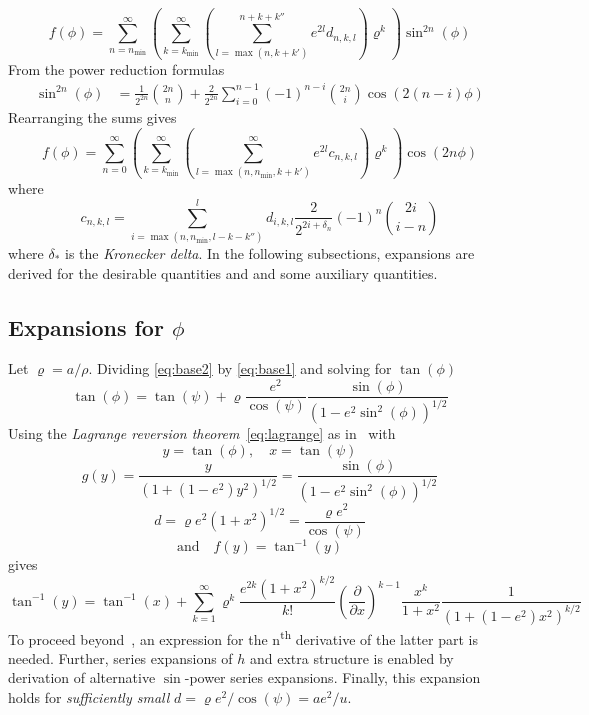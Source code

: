 \documentclass[a4paper]{amsart}
\begin{document}
\begin{equation*}
f(\phi) = \sum_{n=n_{\min}}^\infty \left(\sum_{k=k_{\min}}^\infty\left(\sum_{l=\max(n,k+k')}^{n+k+k''} e^{2l}d_{n,k,l}\right)\varrho^k\right)\sin^{2n}(\phi)
\end{equation*}
From the power reduction formulas
\begin{align*}
\sin^{2n}(\phi) &= \frac{1}{2^{2n}}\binom{2n}{n} + \frac{2}{2^{2n}}\sum_{i=0}^{n-1}(-1)^{n-i}\binom{2n}{i}\cos(2(n-i)\phi)
\end{align*}
Rearranging the sums gives
\begin{equation}
f(\phi)=\sum^\infty_{n=0}\left(\sum_{k=k_{\min}}^\infty\left(\sum_{l=\max(n,n_{\min},k+k')}^\infty e^{2l}c_{n,k,l}\right)\varrho^k\right)\cos(2n\phi)\label{eq:sinPowToCosMul}
\end{equation}
where %
\begin{equation*}
c_{n,k,l}=\sum_{i=\max(n,n_{\min},l-k-k'')}^l d_{i,k,l}\frac{2}{2^{2i+\delta_n}}(-1)^{n}\binom{2i}{i-n}
\end{equation*}
where $\delta_*$ is the \emph{Kronecker delta}.
%
In the following subsections, expansions are derived for the desirable quantities and and some auxiliary quantities.

\subsection{Expansions for $\phi$}\label{app:phi}
Let $\varrho=a/\rho$. Dividing \eqref{eq:base2} by \eqref{eq:base1} and solving for $\tan(\phi)$
\begin{equation}\label{ref:base3}
\tan(\phi) = \tan(\psi) + \varrho\frac{e^2}{\cos(\psi)}\frac{\sin(\phi)}{(1 - e^2\sin^2(\phi))^{1/2}}
\end{equation}
Using the \emph{Lagrange reversion theorem}~\eqref{eq:lagrange} as in~\cite{Morrison1961} with
\begin{equation*}
y = \tan(\phi),\quad x=\tan(\psi)
\end{equation*}
\begin{equation*}
g(y)=\frac{y}{(1+(1-e^2)y^2)^{1/2}}=\frac{\sin(\phi)}{(1 - e^2\sin^2(\phi))^{1/2}}
\end{equation*}
\begin{equation*}
d = \varrho e^2(1+x^2)^{1/2}=\frac{\varrho e^2}{\cos(\psi)}
\end{equation*}
\begin{equation*}
\text{and}\quad f(y)=\tan^{-1}(y)
\end{equation*}
gives
\begin{equation*}
\tan^{-1}(y) = \tan^{-1}(x) + \sum_{k=1}^{\infty}\varrho^k\frac{e^{2k}(1+x^2)^{k/2}}{k!}\left(\frac{\partial}{\partial x}\right)^{k-1}\frac{x^k}{1+x^2}\frac{1}{(1+(1-e^2)x^2)^{k/2}}
\end{equation*}
To proceed beyond~\cite{Morrison1961}, an expression for the n\textsuperscript{th} derivative of the latter part is needed. Further, series expansions of $h$ and extra structure is enabled by derivation of alternative $\sin$-power series expansions. Finally, this expansion holds for \emph{sufficiently small} $d = \varrho e^2/\cos(\psi) = ae^2/u$.
\end{document}
